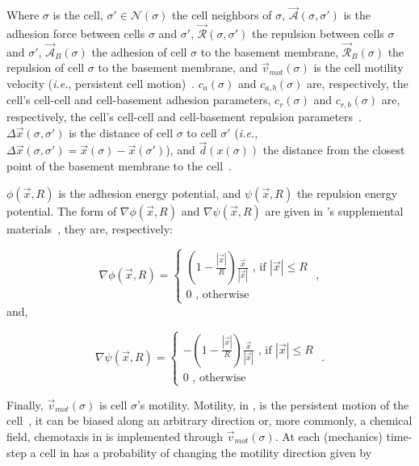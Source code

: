 \noindent Where $\sigma$ is the cell, $\sigma'\in\mathcal{N}(\sigma)$ the cell neighbors of $\sigma$, $\Vec{\mathcal{A}}(\sigma, \sigma')$ is the adhesion force between cells $\sigma$ and $\sigma'$, $\Vec{\mathcal{R}}(\sigma, \sigma')$ the repulsion between cells $\sigma$ and $\sigma'$, $\Vec{\mathcal{A}}_B(\sigma)$ the adhesion of cell $\sigma$ to the basement membrane, $\Vec{\mathcal{R}}_B(\sigma)$ the repulsion of cell $\sigma$ to the basement membrane, and $\Vec{v}_{mot}(\sigma)$ is the cell motility velocity (\textit{i.e.}, persistent cell motion)~\cite{ghaffarizadeh_physicell_2018}. $c_a(\sigma)$ and $c_{a,b}(\sigma)$ are, respectively, the cell's cell-cell and cell-basement adhesion parameters,  $c_r(\sigma)$ and $c_{r,b}(\sigma)$ are, respectively, the cell's cell-cell and cell-basement repulsion parameters~\cite{ghaffarizadeh_physicell_2018}. $\Delta\Vec{x}(\sigma, \sigma')$ is the distance of cell $\sigma$ to cell $\sigma'$ (\textit{i.e.}, $\Delta\Vec{x}(\sigma, \sigma') = \Vec{x}(\sigma) - \Vec{x}(\sigma')$), and $\Vec{d}(x(\sigma))$ the distance from the closest point of the basement membrane to the cell~\cite{ghaffarizadeh_physicell_2018}. 

$\phi(\Vec{x}, R)$ is the adhesion energy potential, and $\psi(\Vec{x}, R)$ the repulsion energy potential. The form of $\nabla\phi(\Vec{x}, R)$ and $\nabla\psi(\Vec{x}, R)$ are given in \psc's supplemental materials~\cite{ghaffarizadeh_physicell_2018}, they are, respectively:

\begin{equation}\label{eq:abm:physi-ad-pot}
    \nabla\phi(\Vec{x}, R) = \begin{cases}
        \left(1 - \frac{|\Vec{x}|}{R} \right)\frac{\Vec{x}}{|\Vec{x}|}\,\,\text{, if }|\Vec{x}|\leq R\\
        0\,\,\text{, otherwise}
    \end{cases}\,\,,
\end{equation}
\noindent and,

\begin{equation}\label{eq:abm:physi-rep-pot}
    \nabla\psi(\Vec{x}, R) = \begin{cases}
        -\left(1 - \frac{|\Vec{x}|}{R} \right)\frac{\Vec{x}}{|\Vec{x}|}\,\,\text{, if }|\Vec{x}|\leq R\\
        0\,\,\text{, otherwise}
    \end{cases}\,\,.
\end{equation}

Finally, $\Vec{v}_{mot}(\sigma)$ is cell $\sigma$'s motility. Motility, in \psc, is the persistent motion of the cell~\cite{ghaffarizadeh_physicell_2018}, it can be biased along an arbitrary direction or, more commonly, a chemical field, chemotaxis in \pscs is implemented through $\Vec{v}_{mot}(\sigma)$. At each (mechanics) time-step a cell in \pscs has a probability of changing the motility direction given by

